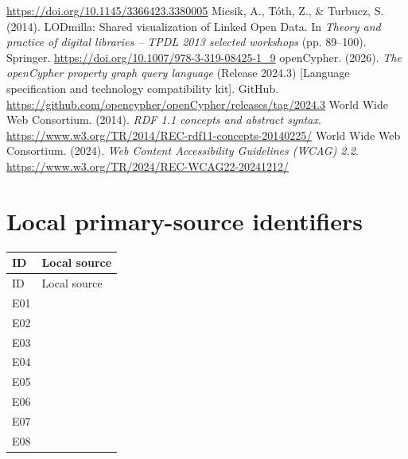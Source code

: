 \documentclass[11pt,a4paper]{article}
\begin{document}
\begin{thebibliography}{99}
\url{https://doi.org/10.1145/3366423.3380005}
Micsik, A., T\'oth, Z., \& Turbucz, S. (2014).
LODmilla: Shared visualization of Linked Open Data.
In \emph{Theory and practice of digital libraries -- TPDL 2013 selected workshops} (pp. 89--100). Springer.
\url{https://doi.org/10.1007/978-3-319-08425-1_9}
openCypher. (2026). \emph{The openCypher property graph query language} (Release 2024.3) [Language specification and technology compatibility kit]. GitHub.
\url{https://github.com/opencypher/openCypher/releases/tag/2024.3}
World Wide Web Consortium. (2014). \emph{RDF 1.1 concepts and abstract syntax}.
\url{https://www.w3.org/TR/2014/REC-rdf11-concepts-20140225/}
World Wide Web Consortium. (2024). \emph{Web Content Accessibility Guidelines (WCAG) 2.2}.
\url{https://www.w3.org/TR/2024/REC-WCAG22-20241212/}
\end{thebibliography}

\appendix
\section{Local primary-source identifiers}
{\small
\begin{longtable}{@{}P{1.1cm}P{14.6cm}@{}}
\toprule ID & Local source\\\midrule
\endfirsthead\toprule ID & Local source\\\midrule\endhead
\bottomrule\endlastfoot
E01 & \\
E02 & \\
E03 & \\
E04 & \\
E05 & \\
E06 & \\
E07 & \\
E08 & \\
\end{longtable}}
\end{document}
